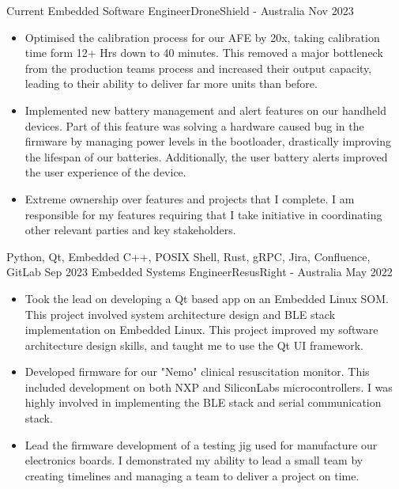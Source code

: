 %
%
%
\begin{experiences}
	\experience
	{Current}	{Embedded Software Engineer}{DroneShield - Australia}
	{Nov 2023}	{
		\begin{itemize}
			\item Optimised the calibration process for our AFE by 20x, taking calibration time form 12+ Hrs down to 40 minutes. This removed a major bottleneck from the production teams process and increased their output capacity, leading to their ability to deliver far more units than before.
			\item Implemented new battery management and alert features on our handheld devices. Part of this feature was solving a hardware caused bug in the firmware by managing power levels in the bootloader, drastically improving the lifespan of our batteries. Additionally, the user battery alerts improved the user experience of the device.
			\item Extreme ownership over features and projects that I complete. I am responsible for my features requiring that I take initiative in coordinating other relevant parties and key stakeholders.
		\end{itemize}
	}
	{Python, Qt, Embedded C++, POSIX Shell, Rust, gRPC, Jira, Confluence, GitLab}
	\emptySeparator
	\experience
	{Sep 2023}	{Embedded Systems Engineer}{ResusRight - Australia}
	{May 2022}	{
		\begin{itemize}
			\item Took the lead on developing a Qt based app on an Embedded Linux SOM. This project involved system architecture design and BLE stack implementation on Embedded Linux. This project improved my software architecture design skills, and taught me to use the Qt UI framework.
			\item Developed firmware for our "Nemo" clinical resuscitation monitor. This included development on both NXP and SiliconLabs microcontrollers. I was highly involved in implementing the BLE stack and serial communication stack.
			\item Lead the firmware development of a testing jig used for manufacture our electronics boards. I demonstrated my ability to lead a small team by creating timelines and managing a team to deliver a project on time.

\end{itemize}}
\end{experiences}
